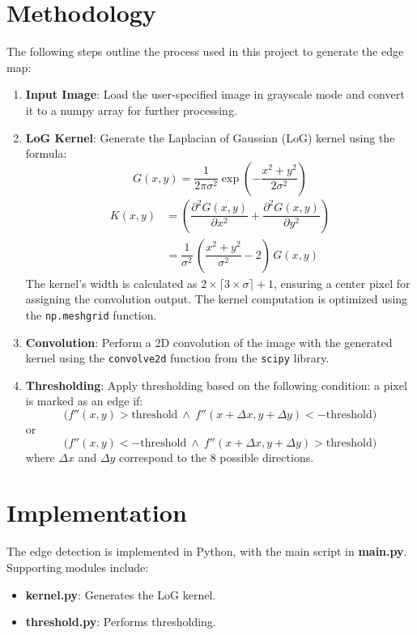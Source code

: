 \documentclass[12pt]{article}
\begin{document}
\section*{Methodology}
The following steps outline the process used in this project to generate the edge map:

\begin{enumerate}
	\item \textbf{Input Image}: Load the user-specified image in grayscale mode and convert it to a numpy array for further processing.

	\item \textbf{LoG Kernel}: Generate the Laplacian of Gaussian (LoG) kernel using the formula:
	      \begin{displaymath}
		      G(x, y) = \dfrac{1}{2 \pi \sigma^2} \exp\left(-\dfrac{x^2 + y^2}{2 \sigma^2}\right)
	      \end{displaymath}
	      \begin{displaymath}
		      \begin{split}
			      K(x, y) & = \left( \dfrac{\partial^2 G(x, y)}{\partial x^2} + \dfrac{\partial^2 G(x, y)}{\partial y^2} \right) \\
			              & = \dfrac{1}{\sigma^2} \, \left(\dfrac{x^2 + y^2}{\sigma^2} - 2\right) \, G(x, y)
		      \end{split}
	      \end{displaymath}
	      The kernel's width is calculated as \(2 \times \lceil 3 \times \sigma \rceil + 1\), ensuring a center pixel for assigning the convolution output. The kernel computation is optimized using the \texttt{np.meshgrid} function.

	\item \textbf{Convolution}: Perform a 2D convolution of the image with the generated kernel using the \texttt{convolve2d} function from the \texttt{scipy} library.

	\item \textbf{Thresholding}: Apply thresholding based on the following condition: a pixel is marked as an edge if:
	      \[
		      \big(f''(x, y) > \text{threshold} \ \land \ f''(x + \Delta x, y + \Delta y) < -\text{threshold}\big)
	      \]
	      or
	      \[
		      \big(f''(x, y) < -\text{threshold} \ \land \ f''(x + \Delta x, y + \Delta y) > \text{threshold}\big)
	      \]
	      where \(\Delta x\) and \(\Delta y\) correspond to the 8 possible directions.
\end{enumerate}


\section*{Implementation}
The edge detection is implemented in Python, with the main script in \textbf{main.py}. Supporting modules include:
\begin{itemize}
	\item \textbf{kernel.py}: Generates the LoG kernel.
	\item \textbf{threshold.py}: Performs thresholding.
\end{itemize}
\end{document}
